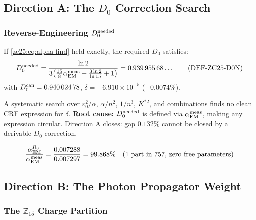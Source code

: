 \documentclass[12pt, a4paper]{article}
\begin{document}
\subsection{Direction A: The $D_0$ Correction Search}
\label{zc25:sec:dirA}

\subsubsection{Reverse-Engineering $D_0^{\rm needed}$}

If \eqref{zc25:eq:alpha-find} held exactly, the required $D_0$ satisfies:
\begin{equation}
  D_0^{\rm needed}
  = \frac{\ln 2}{3\!\left(\tfrac{15}{8}\alpha_{\rm EM}^{\rm meas}
      - \tfrac{3\ln 2}{\ln 15} + 1\right)}
  = 0.939\,955\,68\ldots
  \tag{DEF-ZC25-D0N}\label{zc25:eq:d0n}
\end{equation}
with $D_0^{\rm can} = 0.940\,024\,78$,
$\delta = -6.910\times10^{-5}$ ($-0.0074\%$).

\begin{derivedbox}[title={FIND-ZC25-06: Direction A Closes Formally}]
A systematic search over $\varepsilon_0^2/\alpha$, $\alpha/n^2$,
$1/n^3$, $K^{*2}$, and combinations finds no clean CRF
expression for $\delta$.
\textbf{Root cause:} $D_0^{\rm needed}$ is defined via
$\alpha_{\rm EM}^{\rm meas}$, making any expression circular.
Direction A closes: gap $0.132\%$ cannot be closed by a
derivable $D_0$ correction.
\end{derivedbox}

\begin{derivedbox}[title={FIND-ZC25-05: Prediction Accuracy}]
\[
  \frac{\alpha_{\rm EM}^{R_0}}{\alpha_{\rm EM}^{\rm meas}}
  = \frac{0.007288}{0.007297} = 99.868\%
  \quad \text{(1 part in 757, zero free parameters)}
\]
\end{derivedbox}

\subsection{Direction B: The Photon Propagator Weight}
\label{zc25:sec:dirB}

\subsubsection{The $\mathbb{Z}_{15}$ Charge Partition}
\end{document}
